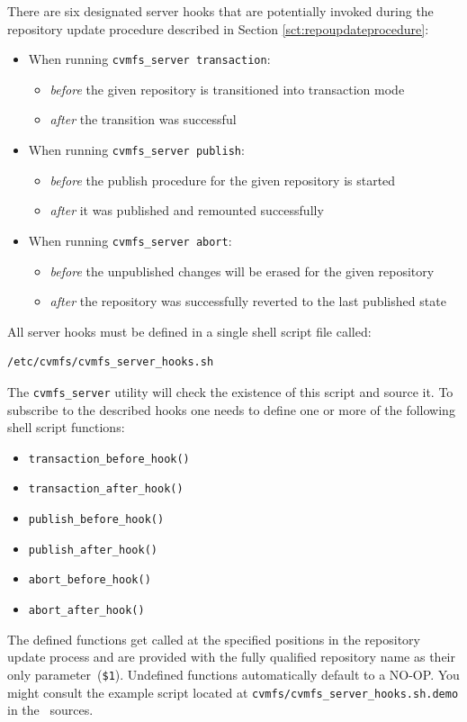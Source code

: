 There are six designated server hooks that are potentially invoked during the repository update procedure described in Section \ref{sct:repoupdateprocedure}:
\begin{itemize}
	\item When running \texttt{cvmfs\_server transaction}:
	\begin{itemize}
		\item \emph{before} the given repository is transitioned into transaction mode
		\item \emph{after} the transition was successful
	\end{itemize}
	\item When running \texttt{cvmfs\_server publish}:
	\begin{itemize}
		\item \emph{before} the publish procedure for the given repository is started
		\item \emph{after} it was published and remounted successfully
	\end{itemize}
	\item When running \texttt{cvmfs\_server abort}:
	\begin{itemize}
		\item \emph{before} the unpublished changes will be erased for the given repository
		\item \emph{after} the repository was successfully reverted to the last published state
	\end{itemize}
\end{itemize}
All server hooks must be defined in a single shell script file called:
\begin{verbatim}
/etc/cvmfs/cvmfs_server_hooks.sh
\end{verbatim}
The \texttt{cvmfs\_server} utility will check the existence of this script and source it.
To subscribe to the described hooks one needs to define one or more of the following shell script functions:
\begin{itemize}
	\setlength{\itemsep}{1pt}
	\item \texttt{transaction\_before\_hook()}
	\item \texttt{transaction\_after\_hook()}
\end{itemize}
\begin{itemize}
	\item \texttt{publish\_before\_hook()}
	\item \texttt{publish\_after\_hook()}
\end{itemize}
\begin{itemize}
	\item \texttt{abort\_before\_hook()}
	\item \texttt{abort\_after\_hook()}
\end{itemize}
The defined functions get called at the specified positions in the repository update process and are provided with the fully qualified repository name as their only parameter~(\texttt{\$1}).
Undefined functions automatically default to a NO-OP.
You might consult the example script located at \texttt{cvmfs/cvmfs\_server\_hooks.sh.demo} in the \cvmfs\ sources.
